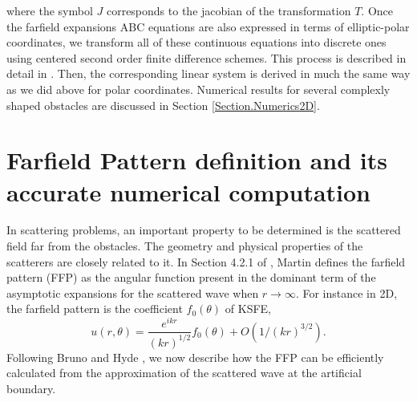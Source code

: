 \documentclass[final,3p,times,12pt]{elsarticle}
\begin{document}
where the symbol $J$ corresponds to the jacobian of the transformation $T$. Once the farfield expansions ABC equations are also expressed in terms of elliptic-polar coordinates, we transform all of these continuous equations into discrete ones using centered second order finite difference schemes. This process is described in detail in \cite{JCP2010}. Then, the corresponding linear system is derived in much the same way as we did above for polar coordinates.  Numerical results for several complexly shaped obstacles are discussed in Section \ref{Section.Numerics2D}.

\section{Farfield Pattern definition and its accurate numerical computation}
\label{NumericalFFP}
In scattering problems, an important property  to be determined is the scattered field far from the obstacles. The geometry and physical properties of the scatterers are closely related to it.
In Section 4.2.1 of \cite{MartinBook}, Martin defines the farfield pattern (FFP) as the angular function present in the dominant term of the asymptotic expansions for  the scattered wave when $r\rightarrow\infty$. For instance in 2D, the farfield pattern is the coefficient $f_0(\theta)$ of KSFE,
\begin{equation}
u(r,\theta)=
\frac{e^{ikr}}{(kr)^{1/2}}f_0(\theta)+O\left(1/(kr)^{3/2}\right). \label{KSFE}
\end{equation}
Following Bruno and Hyde \cite{McKaySIAM}, we now describe how the FFP can be efficiently 
calculated from the  approximation of the scattered wave at 
the artificial boundary.
\end{document}
